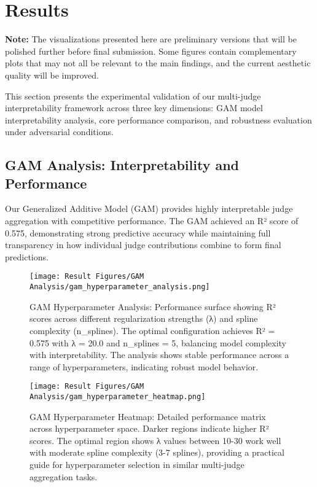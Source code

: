 \section{Results}

\textbf{Note:} The visualizations presented here are preliminary versions that will be polished further before final submission. Some figures contain complementary plots that may not all be relevant to the main findings, and the current aesthetic quality will be improved.

This section presents the experimental validation of our multi-judge interpretability framework across three key dimensions: GAM model interpretability analysis, core performance comparison, and robustness evaluation under adversarial conditions.

\subsection{GAM Analysis: Interpretability and Performance}

Our Generalized Additive Model (GAM) provides highly interpretable judge aggregation with competitive performance. The GAM achieved an R² score of 0.575, demonstrating strong predictive accuracy while maintaining full transparency in how individual judge contributions combine to form final predictions.

\begin{figure}[H]
    \centering
    \texttt{[image: Result Figures/GAM Analysis/gam\_hyperparameter\_analysis.png]}
    \caption{GAM Hyperparameter Analysis: Performance surface showing R² scores across different regularization strengths (λ) and spline complexity (n\_splines). The optimal configuration achieves R² = 0.575 with λ = 20.0 and n\_splines = 5, balancing model complexity with interpretability. The analysis shows stable performance across a range of hyperparameters, indicating robust model behavior.}
    \label{fig:gam_hyperparameter_analysis}
\end{figure}

\begin{figure}[H]
    \centering
    \texttt{[image: Result Figures/GAM Analysis/gam\_hyperparameter\_heatmap.png]}
    \caption{GAM Hyperparameter Heatmap: Detailed performance matrix across hyperparameter space. Darker regions indicate higher R² scores. The optimal region shows λ values between 10-30 work well with moderate spline complexity (3-7 splines), providing a practical guide for hyperparameter selection in similar multi-judge aggregation tasks.}
    \label{fig:gam_hyperparameter_heatmap}
\end{figure}


